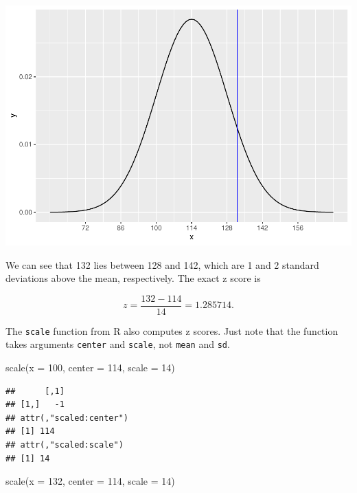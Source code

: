 \documentclass[
]{book}
\newenvironment{Shaded}{\begin{snugshade}}{\end{snugshade}}
\newcommand{\AttributeTok}[1]{\textcolor[rgb]{0.77,0.63,0.00}{#1}}
\newcommand{\DecValTok}[1]{\textcolor[rgb]{0.00,0.00,0.81}{#1}}
\newcommand{\FunctionTok}[1]{\textcolor[rgb]{0.00,0.00,0.00}{#1}}
\newcommand{\NormalTok}[1]{#1}
\begin{document}
\includegraphics{intro_stats_files/figure-latex/unnamed-chunk-354-1.pdf}

We can see that 132 lies between 128 and 142, which are 1 and 2 standard deviations above the mean, respectively. The exact z score is

\[
z = \frac{132 - 114}{14} = 1.285714.
\]

The \texttt{scale} function from R also computes z scores. Just note that the function takes arguments \texttt{center} and \texttt{scale}, not \texttt{mean} and \texttt{sd}.

\begin{Shaded}
\begin{Highlighting}[]
\FunctionTok{scale}\NormalTok{(}\AttributeTok{x =} \DecValTok{100}\NormalTok{, }\AttributeTok{center =} \DecValTok{114}\NormalTok{, }\AttributeTok{scale =} \DecValTok{14}\NormalTok{)}
\end{Highlighting}
\end{Shaded}

\begin{verbatim}
##      [,1]
## [1,]   -1
## attr(,"scaled:center")
## [1] 114
## attr(,"scaled:scale")
## [1] 14
\end{verbatim}

\begin{Shaded}
\begin{Highlighting}[]
\FunctionTok{scale}\NormalTok{(}\AttributeTok{x =} \DecValTok{132}\NormalTok{, }\AttributeTok{center =} \DecValTok{114}\NormalTok{, }\AttributeTok{scale =} \DecValTok{14}\NormalTok{)}
\end{Highlighting}
\end{Shaded}
\end{document}
